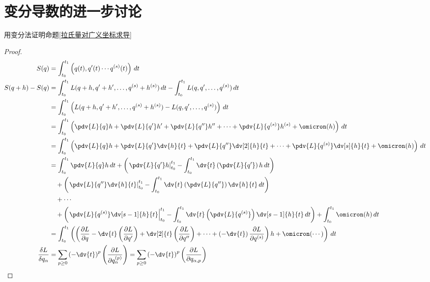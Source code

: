 \documentclass[12pt, a4paper, oneside, UTF8]{ctexbook}  %
\newcommand{\pa}{\partial}
\begin{document}
\section{变分导数的进一步讨论}
\begin{example}
    用变分法证明命题\ref{拉氏量对广义坐标求导}
    \begin{proof}
    \begin{align*}
        S(q)&=\int_{t_0}^{t_1}\left(q(t),q'(t)\cdots q^{(s)}(t)\right)\,dt\\
        S(q + h) - S(q) &= \int_{t_0}^{t_1} L(q + h, q' + h', \dots, q^{(s)} + h^{(s)}) \, dt 
        - \int_{t_0}^{t_1} L(q, q', \dots, q^{(s)}) \, dt \\
        &= \int_{t_0}^{t_1} \left( L(q + h, q' + h', \dots, q^{(s)} + h^{(s)}) 
        - L(q, q', \dots, q^{(s)}) \right) \, dt \\
        &= \int_{t_0}^{t_1} \left( \pdv{L}{q} h + \pdv{L}{q'} h' + \pdv{L}{q''} h'' 
        + \cdots + \pdv{L}{q^{(s)}} h^{(s)} + \omicron(h) \right) \, dt \\
        &= \int_{t_0}^{t_1} \left( \pdv{L}{q} h + \pdv{L}{q'} \dv{h}{t} 
        + \pdv{L}{q''} \dv[2]{h}{t} + \cdots + \pdv{L}{q^{(s)}} \dv[s]{h}{t} 
        + \omicron(h) \right) \, dt \\
        &= \int_{t_0}^{t_1} \pdv{L}{q} h \, dt 
        + \left( \left. \pdv{L}{q'} h \right|_{t_0}^{t_1} 
        - \int_{t_0}^{t_1} \dv{t} \left( \pdv{L}{q'} \right) h \, dt \right) \\
    &\quad + \left( \left. \pdv{L}{q''} \dv{h}{t} \right|_{t_0}^{t_1} 
    - \int_{t_0}^{t_1} \dv{t} \left( \pdv{L}{q''} \right) \dv{h}{t} \, dt \right) \\
    &\quad + \cdots \\
    &\quad + \left( \left. \pdv{L}{q^{(s)}} \dv[s-1]{h}{t} \right|_{t_0}^{t_1} 
    - \int_{t_0}^{t_1} \dv{t} \left( \pdv{L}{q^{(s)}} \right) \dv[s-1]{h}{t} \, dt \right) 
    + \int_{t_0}^{t_1} \omicron(h) \, dt \\
    &=\int_{t_0}^{t_1}\left(\left(
        \frac{\pa L}{\pa q}-\dv{t}\left(\frac{\pa L}{\pa q'}\right)
        +\dv[2]{t}\left(\frac{\pa L}{\pa q''}\right)+\cdots+\left(-\dv{t}\right)\frac{\pa L}{\pa q^{(s)}}
    \right)
    h+\omicron(\cdots)\right)\,dt\\
    \frac{\delta L}{\delta q_\alpha}&=
    \sum_{p \geq 0}\left(-\dv{t}\right)^p
    \left(\frac{\pa L}{\pa q_\alpha^{(p)}}\right)=
    \sum_{p \geq 0}\left(-\dv{t}\right)^p
    \left(\frac{\pa L}{\pa q_{\alpha,p}}\right)
    \end{align*}
\end{proof}
\end{example}
\end{document}
